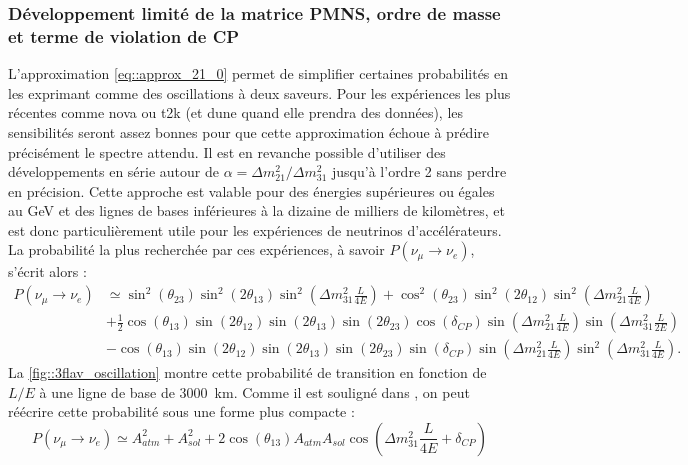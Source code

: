       \subsubsection{Développement limité de la matrice PMNS, ordre de masse et terme de violation de CP}
        L'approximation \eqref{eq::approx_21_0} permet de simplifier certaines probabilités en les exprimant comme des oscillations à deux saveurs. Pour les expériences les plus récentes comme \gls{nova} ou \gls{t2k} (et \gls{dune} quand elle prendra des données), les sensibilités seront assez bonnes pour que cette approximation échoue à prédire précisément le spectre attendu. Il est en revanche possible d'utiliser des développements en série autour de $\alpha=\Delta m^2_{21}/\Delta m^2_{31}$ jusqu'à l'ordre 2 sans perdre en précision. Cette approche est valable pour des énergies supérieures ou égales au \si{\giga\electronvolt} et des lignes de bases inférieures à la dizaine de milliers de kilomètres\cite{Freund2001}, et est donc particulièrement utile pour les expériences de neutrinos d'accélérateurs. La probabilité la plus recherchée par ces expériences, à savoir $P(\nu_{\mu}\to\nu_e)$, s'écrit alors\cite{Giganti2017}
        : 
        \begin{equation}\label{eq::dvpt_3flavor_accelerator}
          \begin{split}
            P(\nu_{\mu}\to\nu_e) & \simeq  \sin^2(\theta_{23})\sin^2(2\theta_{13})\sin^2\left(\Delta m^2_{31}\frac{L}{4E}\right)
            + \cos^2(\theta_{23})\sin^2(2\theta_{12})\sin^2\left(\Delta m^2_{21}\frac{L}{4E}\right) \\ 
            & + \frac{1}{2}\cos(\theta_{13})\sin(2\theta_{12})\sin(2\theta_{13})\sin(2\theta_{23})\cos(\delta_{CP})\sin\left(\Delta m^2_{21}\frac{L}{4E}\right)\sin\left(\Delta m^2_{31}\frac{L}{2E}\right) \\
            & - \cos(\theta_{13})\sin(2\theta_{12})\sin(2\theta_{13})\sin(2\theta_{23})\sin(\delta_{CP})\sin\left(\Delta m^2_{21}\frac{L}{4E}\right)\sin^2\left(\Delta m^2_{31}\frac{L}{4E}\right).
          \end{split}
        \end{equation}
        La \autoref{fig::3flav_oscillation} montre cette probabilité de transition en fonction de $L/E$ à une ligne de base de \SI{3000}{\kilo\meter}. Comme il est souligné dans \cite{Giganti2017}, on peut réécrire cette probabilité sous une forme plus compacte : 
        \begin{equation}
          P(\nu_{\mu}\to\nu_e) \simeq A^2_{atm} + A^2_{sol} + 2\cos(\theta_{13})A_{atm}A_{sol}\cos\left(\Delta m^2_{31}\frac{L}{4E} + \delta_{CP}\right)
        \end{equation}
